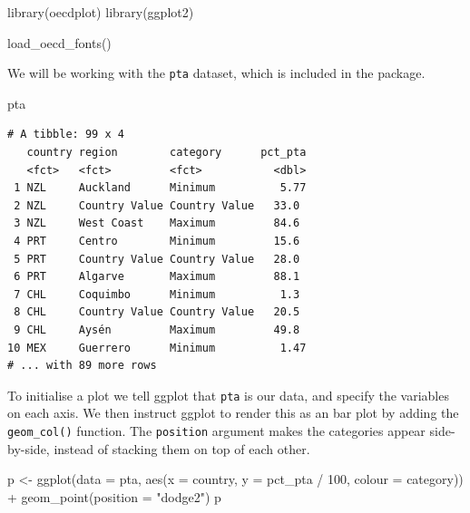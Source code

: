 \documentclass[
  11pt,
  oneside]{report}
\newenvironment{Shaded}{\begin{snugshade}}{\end{snugshade}}
\newcommand{\AttributeTok}[1]{\textcolor[rgb]{0.77,0.63,0.00}{#1}}
\newcommand{\DecValTok}[1]{\textcolor[rgb]{0.00,0.00,0.81}{#1}}
\newcommand{\FunctionTok}[1]{\textcolor[rgb]{0.00,0.00,0.00}{#1}}
\newcommand{\NormalTok}[1]{#1}
\newcommand{\OtherTok}[1]{\textcolor[rgb]{0.56,0.35,0.01}{#1}}
\newcommand{\SpecialCharTok}[1]{\textcolor[rgb]{0.00,0.00,0.00}{#1}}
\newcommand{\StringTok}[1]{\textcolor[rgb]{0.31,0.60,0.02}{#1}}
\begin{document}
\begin{Shaded}
\begin{Highlighting}[]
\FunctionTok{library}\NormalTok{(oecdplot)}
\FunctionTok{library}\NormalTok{(ggplot2)}

\FunctionTok{load\_oecd\_fonts}\NormalTok{()}
\end{Highlighting}
\end{Shaded}

We will be working with the \texttt{pta} dataset, which is included in
the package.

\begin{Shaded}
\begin{Highlighting}[]
\NormalTok{pta}
\end{Highlighting}
\end{Shaded}

\begin{verbatim}
# A tibble: 99 x 4
   country region        category      pct_pta
   <fct>   <fct>         <fct>           <dbl>
 1 NZL     Auckland      Minimum          5.77
 2 NZL     Country Value Country Value   33.0 
 3 NZL     West Coast    Maximum         84.6 
 4 PRT     Centro        Minimum         15.6 
 5 PRT     Country Value Country Value   28.0 
 6 PRT     Algarve       Maximum         88.1 
 7 CHL     Coquimbo      Minimum          1.3 
 8 CHL     Country Value Country Value   20.5 
 9 CHL     Aysén         Maximum         49.8 
10 MEX     Guerrero      Minimum          1.47
# ... with 89 more rows
\end{verbatim}

To initialise a plot we tell ggplot that \texttt{pta} is our data, and
specify the variables on each axis. We then instruct ggplot to render
this as an bar plot by adding the \texttt{geom\_col()} function. The
\texttt{position} argument makes the categories appear side-by-side,
instead of stacking them on top of each other.

\begin{Shaded}
\begin{Highlighting}[]
\NormalTok{p }\OtherTok{\textless{}{-}} \FunctionTok{ggplot}\NormalTok{(}\AttributeTok{data =}\NormalTok{ pta, }\FunctionTok{aes}\NormalTok{(}\AttributeTok{x =}\NormalTok{ country, }\AttributeTok{y =}\NormalTok{ pct\_pta }\SpecialCharTok{/} \DecValTok{100}\NormalTok{, }\AttributeTok{colour =}\NormalTok{ category)) }\SpecialCharTok{+}
  \FunctionTok{geom\_point}\NormalTok{(}\AttributeTok{position =} \StringTok{"dodge2"}\NormalTok{)}
\NormalTok{p}
\end{Highlighting}
\end{Shaded}
\end{document}
